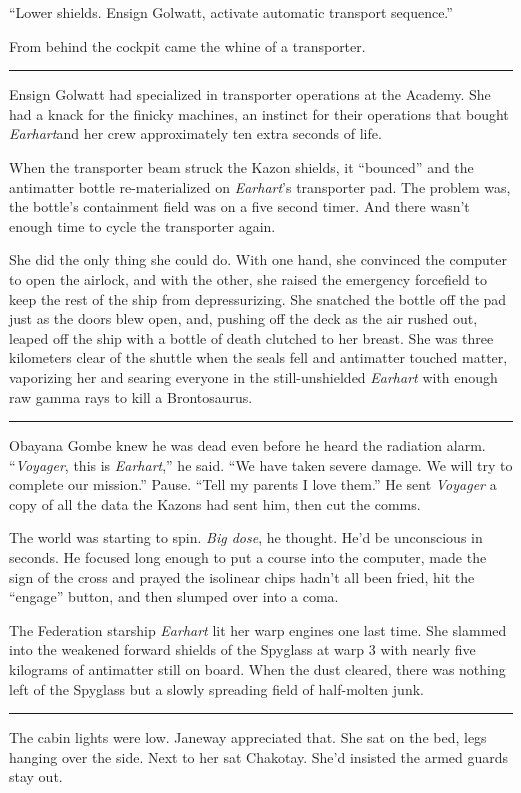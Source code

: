 \documentclass[twoside,letterpaper,12pt]{memoir}
\begin{document}
``Lower shields. Ensign Golwatt, activate automatic transport sequence.''

From behind the cockpit came the whine of a transporter.

\fancybreak{\rule{3cm}{0.4 pt}}
Ensign Golwatt had specialized in transporter operations at the Academy. She had a knack for the finicky machines, an instinct for their operations that bought \textit{Earhart}and her crew approximately ten extra seconds of life.

When the transporter beam struck the Kazon shields, it ``bounced'' and the antimatter bottle re-materialized on \textit{Earhart}'s transporter pad. The problem was, the bottle's containment field was on a five second timer. And there wasn't enough time to cycle the transporter again.

She did the only thing she could do. With one hand, she convinced the computer to open the airlock, and with the other, she raised the emergency forcefield to keep the rest of the ship from depressurizing. She snatched the bottle off the pad just as the doors blew open, and, pushing off the deck as the air rushed out, leaped off the ship with a bottle of death clutched to her breast. She was three kilometers clear of the shuttle when the seals fell and antimatter touched matter, vaporizing her and searing everyone in the still-unshielded \textit{Earhart} with enough raw gamma rays to kill a Brontosaurus.

\fancybreak{\rule{3cm}{0.4 pt}}
Obayana Gombe knew he was dead even before he heard the radiation alarm. ``\textit{Voyager}, this is \textit{Earhart},'' he said. ``We have taken severe damage. We will try to complete our mission.'' Pause. ``Tell my parents I love them.'' He sent \textit{Voyager} a copy of all the data the Kazons had sent him, then cut the comms.

The world was starting to spin. \textit{Big dose}, he thought. He'd be unconscious in seconds. He focused long enough to put a course into the computer, made the sign of the cross and prayed the isolinear chips hadn't all been fried, hit the ``engage'' button, and then slumped over into a coma.

The Federation starship \textit{Earhart} lit her warp engines one last time. She slammed into the weakened forward shields of the Spyglass at warp 3 with nearly five kilograms of antimatter still on board. When the dust cleared, there was nothing left of the Spyglass but a slowly spreading field of half-molten junk.

\fancybreak{\rule{3cm}{0.4 pt}}
The cabin lights were low. Janeway appreciated that. She sat on the bed, legs hanging over the side. Next to her sat Chakotay. She'd insisted the armed guards stay out.
\end{document}
